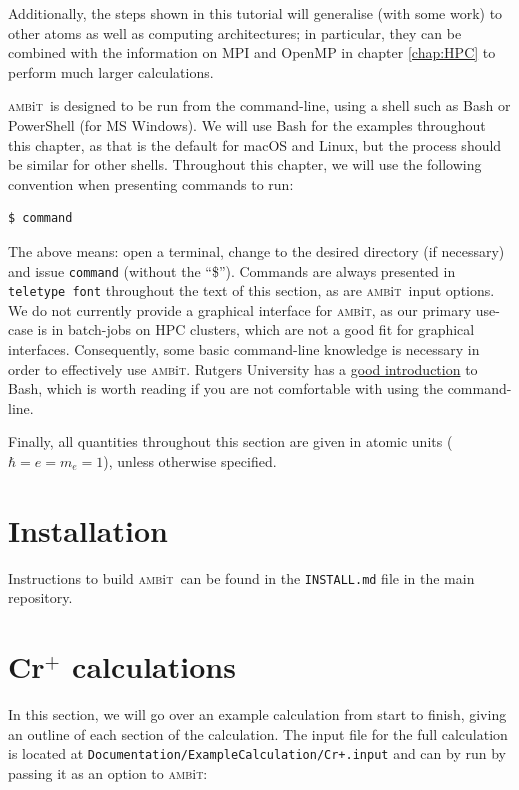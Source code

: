 \documentclass{report}
\newcommand{\ambit}{\textsc{amb}{\footnotesize i}\textsc{t}}
\begin{document}
Additionally, the steps shown in this tutorial will generalise
(with some work) to other atoms as well as computing architectures; in particular, they can be
combined with the information on MPI and OpenMP in chapter \ref{chap:HPC} to perform much larger
calculations.

\ambit\  is designed to be run from the command-line, using a shell such as Bash or PowerShell (for MS
Windows). We will
use Bash for the examples throughout this chapter, as that is the default for macOS and Linux, but the
process should be similar for other shells. Throughout this chapter, we will use the following
convention when presenting commands to run:

\begin{verbatim}
$ command
\end{verbatim}

The above means: open a terminal, change to the desired directory (if necessary) and issue
\texttt{command} (without the ``\$''). Commands are always presented in \texttt{teletype font}
throughout the text of this section, as are \ambit\  input options. We do not currently provide a 
graphical interface for \ambit, as our primary use-case is in batch-jobs on HPC clusters, which are not
a good fit for graphical interfaces. Consequently, some basic command-line knowledge is necessary in
order to effectively use \ambit. Rutgers University has a
\href{http://linuxcourse.rutgers.edu/documents/Bash-Beginners-Guide/}{good introduction} to Bash, which
is worth reading if you are not comfortable with using the command-line.

Finally, all quantities throughout this section are given in atomic units ($\hbar = e = m_e = 1$), 
unless otherwise specified.

\section{Installation}
Instructions to build \ambit\ can be found in the \texttt{INSTALL.md} file in the main repository.

\section{Cr$^+$ calculations}

In this section, we will go over an example calculation from start to finish, giving an outline of each
section of the calculation. The input file for the full calculation is located at 
\texttt{Documentation/ExampleCalculation/Cr+.input} and can by run by passing it as an option to
\ambit:
\end{document}

